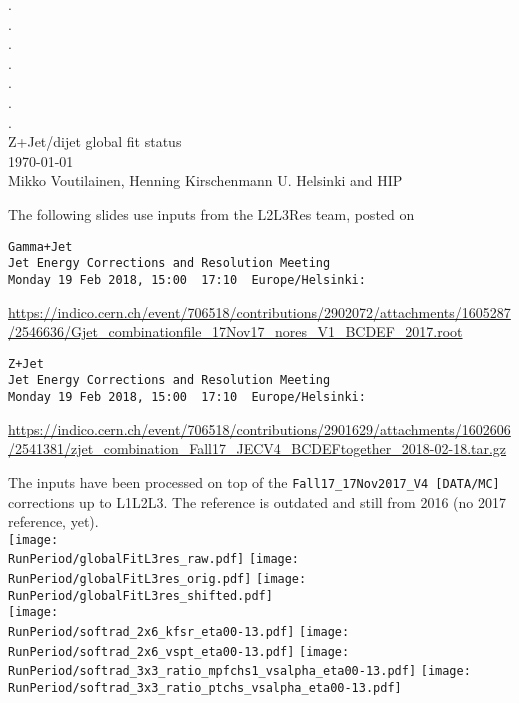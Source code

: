 \documentclass[landscape,10pt]{beamer} %
\def\RunPeriod{BCDEF}%
\begin{document}
\begin{centering}
{. }\\
{. }\\
{. }\\
{. }\\
{. }\\
{. }\\
{. }\\
Z+Jet/dijet global fit status\\
\today\\
Mikko Voutilainen, Henning Kirschenmann
U. Helsinki and HIP\\
\end{centering}
\newpage

The following slides use inputs from the L2L3Res team, posted on 
%
%


\begin{verbatim}
Gamma+Jet
Jet Energy Corrections and Resolution Meeting
Monday 19 Feb 2018, 15:00  17:10  Europe/Helsinki: 
\end{verbatim}
\url{https://indico.cern.ch/event/706518/contributions/2902072/attachments/1605287/2546636/Gjet_combinationfile_17Nov17_nores_V1_BCDEF_2017.root}

\begin{verbatim}
Z+Jet
Jet Energy Corrections and Resolution Meeting
Monday 19 Feb 2018, 15:00  17:10  Europe/Helsinki: 
\end{verbatim}
\url{https://indico.cern.ch/event/706518/contributions/2901629/attachments/1602606/2541381/zjet_combination_Fall17_JECV4_BCDEFtogether_2018-02-18.tar.gz}

The inputs have been processed on top of the \verb|Fall17_17Nov2017_V4 [DATA/MC]| corrections up to L1L2L3. The reference is outdated and still from 2016 (no 2017 reference, yet). \\

\newpage
\texttt{[image: \\RunPeriod/globalFitL3res\_raw.pdf]}
\texttt{[image: \\RunPeriod/globalFitL3res\_orig.pdf]}
\texttt{[image: \\RunPeriod/globalFitL3res\_shifted.pdf]}\\
\texttt{[image: \\RunPeriod/softrad\_2x6\_kfsr\_eta00-13.pdf]}
\texttt{[image: \\RunPeriod/softrad\_2x6\_vspt\_eta00-13.pdf]}
\texttt{[image: \\RunPeriod/softrad\_3x3\_ratio\_mpfchs1\_vsalpha\_eta00-13.pdf]}
\texttt{[image: \\RunPeriod/softrad\_3x3\_ratio\_ptchs\_vsalpha\_eta00-13.pdf]}\\
\end{document}
